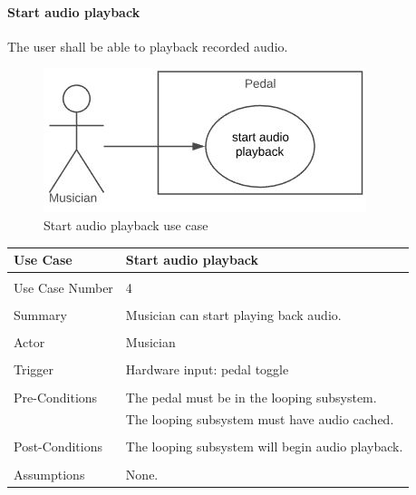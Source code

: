       
        \paragraph{Start audio playback} 
            The user shall be able to playback recorded audio.
            \begin{figure}[!ht]
                \centering
                \includegraphics[width=.5\textwidth]{diagrams/use_cases/uc-play-start.JPG}
                \caption{Start audio playback use case}
                \label{fig:uc-play-start}
            \end{figure}
            \begin{table}[!ht]
                \centering
                \begin{tabular}{l l}
                    Use Case & Start audio playback \\ 
                    \hline \\
                    Use Case Number & 4 \\ \\
                    Summary & Musician can start playing back audio. \\ \\
                    Actor & Musician \\ \\
                    Trigger & Hardware input: pedal toggle \\ \\
                    Pre-Conditions & The pedal must be in the looping subsystem. \\
                    & The looping subsystem must have audio cached. \\ \\
                    Post-Conditions & The looping subsystem will begin audio playback. \\ \\
                    Assumptions & None.\\ 
                \end{tabular}
            \end{table}
    
